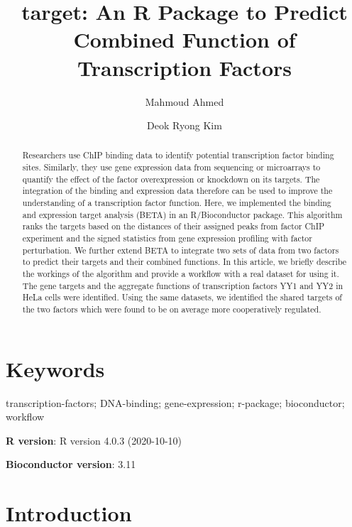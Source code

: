 \documentclass[9pt,a4paper,]{extarticle}
\begin{document}
\pagestyle{front}

\title{target: An R Package to Predict Combined Function of Transcription Factors}

\author[1]{Mahmoud Ahmed}
\author[1]{Deok Ryong Kim}

\maketitle
\thispagestyle{front}

\begin{abstract}
Researchers use ChIP binding data to identify potential transcription factor binding sites. Similarly, they use gene expression data from sequencing or microarrays to quantify the effect of the factor overexpression or knockdown on its targets. The integration of the binding and expression data therefore can be used to improve the understanding of a transcription factor function. Here, we implemented the binding and expression target analysis (BETA) in an R/Bioconductor package. This algorithm ranks the targets based on the distances of their assigned peaks from factor ChIP experiment and the signed statistics from gene expression profiling with factor perturbation. We further extend BETA to integrate two sets of data from two factors to predict their targets and their combined functions. In this article, we briefly describe the workings of the algorithm and provide a workflow with a real dataset for using it. The gene targets and the aggregate functions of transcription factors YY1 and YY2 in HeLa cells were identified. Using the same datasets, we identified the shared targets of the two factors which were found to be on average more cooperatively regulated.
\end{abstract}

\section*{Keywords}
transcription-factors; DNA-binding; gene-expression; r-package; bioconductor; workflow


\clearpage
\pagestyle{main}

\textbf{R version}: R version 4.0.3 (2020-10-10)

\textbf{Bioconductor version}: 3.11

\hypertarget{introduction}{%
\section{Introduction}\label{introduction}}
\end{document}
